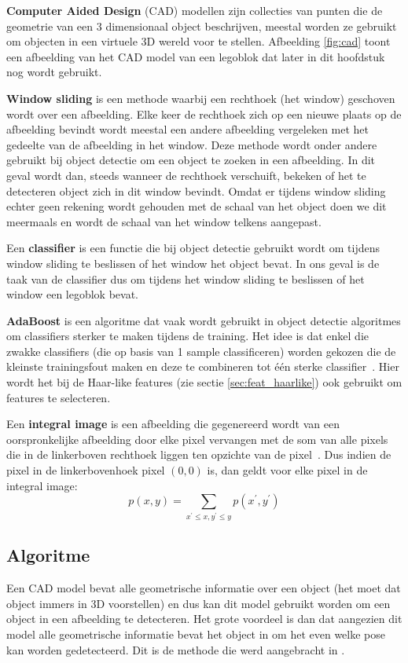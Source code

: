 \textbf{Computer Aided Design} (CAD) modellen zijn collecties van punten die de geometrie van een 3 dimensionaal object beschrijven, meestal worden ze gebruikt om objecten in een virtuele 3D wereld voor te stellen. Afbeelding \ref{fig:cad} toont een afbeelding van het CAD model van een legoblok dat later in dit hoofdstuk nog wordt gebruikt.

\textbf{Window sliding} is een methode waarbij een rechthoek (het window) geschoven wordt over een afbeelding. Elke keer de rechthoek zich op een nieuwe plaats op de afbeelding bevindt wordt meestal een andere afbeelding vergeleken met het gedeelte van de afbeelding in het window. Deze methode wordt onder andere gebruikt bij object detectie om een object te zoeken in een afbeelding. In dit geval wordt dan, steeds wanneer de rechthoek verschuift, bekeken of het te detecteren object zich in dit window bevindt. Omdat er tijdens window sliding echter geen rekening wordt gehouden met de schaal van het object doen we dit meermaals en wordt de schaal van het window telkens aangepast.

Een \textbf{classifier} is een functie die bij object detectie gebruikt wordt om tijdens window sliding te beslissen of het window het object bevat. In ons geval is de taak van de classifier dus om tijdens het window sliding te beslissen of het window een legoblok bevat.

\textbf{AdaBoost} is een algoritme dat vaak wordt gebruikt in object detectie algoritmes om classifiers sterker te maken tijdens de training. Het idee is dat enkel die zwakke classifiers (die op basis van 1 sample classificeren) worden gekozen die de kleinste trainingsfout maken en deze te combineren tot \'e\'en sterke classifier~\cite{freund1995desicion}. Hier wordt het bij de Haar-like features (zie sectie \ref{sec:feat_haarlike}) ook gebruikt om features te selecteren. 

Een \textbf{integral image} is een afbeelding die gegenereerd wordt van een oorspronkelijke afbeelding door elke pixel vervangen met de som van alle pixels die in de linkerboven rechthoek liggen ten opzichte van de pixel~\cite{viola2001rapid}. Dus indien de pixel in de linkerbovenhoek pixel $(0,0)$ is, dan geldt voor elke pixel in de integral image:
$$p(x,y)=\sum_{x^\prime \leq x,y^\prime \leq y} p(x^\prime,y^\prime)$$

\subsection{Algoritme}
Een CAD model bevat alle geometrische informatie over een object (het moet dat object immers in 3D voorstellen) en dus kan dit model gebruikt worden om een object in een afbeelding te detecteren. Het grote voordeel is dan dat aangezien dit model alle geometrische informatie bevat het object in om het even welke pose kan worden gedetecteerd. Dit is de methode die werd aangebracht in \cite{aubry2014seeing}.

